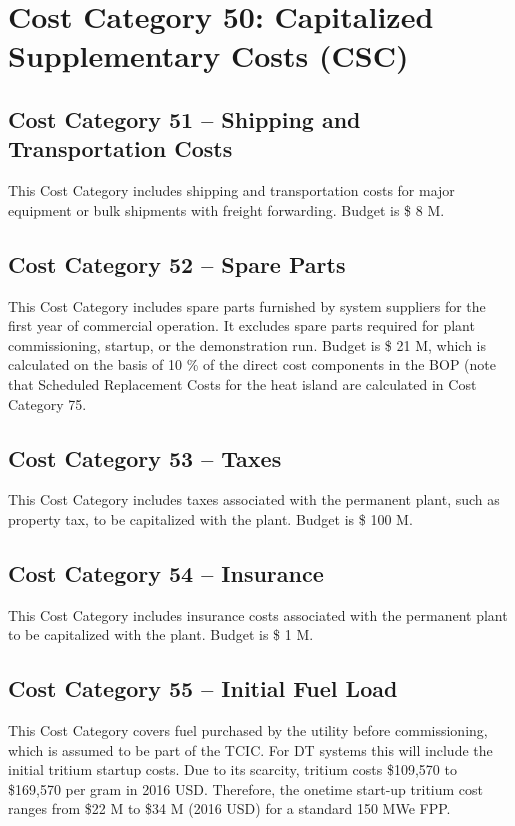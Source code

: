 \section{Cost Category 50: Capitalized Supplementary Costs (CSC)}


\subsection*{Cost Category 51 – Shipping and Transportation Costs}
This Cost Category includes shipping and transportation costs for major equipment or bulk shipments with freight forwarding. Budget is \$ 8 M.

\subsection*{Cost Category 52 – Spare Parts}
This Cost Category includes spare parts furnished by system suppliers for the first year of commercial operation. It excludes spare parts required for plant commissioning, startup, or the demonstration run.  Budget is \$ 21 M, which is calculated on the basis of 10 \% of the direct cost components in the BOP (note that Scheduled Replacement Costs for the heat island are calculated in Cost Category 75.

\subsection*{Cost Category 53 – Taxes}
This Cost Category includes taxes associated with the permanent plant, such as property tax, to be capitalized with the plant. Budget is \$ 100 M.

\subsection*{Cost Category 54 – Insurance}
This Cost Category includes insurance costs associated with the permanent plant to be capitalized with the plant.  Budget is \$ 1 M.

\subsection*{Cost Category 55 – Initial Fuel Load}
This Cost Category covers fuel purchased by the utility before commissioning, which is assumed to be part of the TCIC. For DT systems this will include the initial tritium startup costs.  Due to its scarcity, tritium costs \$109,570 to \$169,570 per gram in 2016 USD. Therefore, the onetime start-up tritium cost ranges from \$22 M to \$34 M (2016 USD) for a standard 150 MWe FPP. \\


